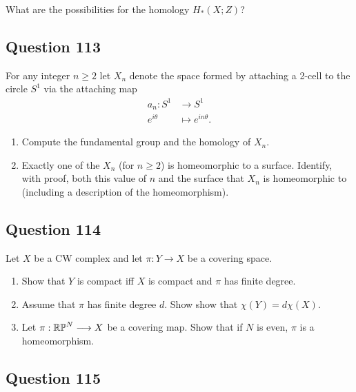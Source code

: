 \documentclass[12pt]{article}
\begin{document}
What are the possibilities for the homology \(H_* (X; Z)\)?

\hypertarget{question-113-2}{%
\subsection{Question 113}\label{question-113-2}}

For any integer \(n \geq 2\) let \(X_n\) denote the space formed by
attaching a 2-cell to the circle \(S^1\) via the attaching map
\begin{align*}
a_n: S^1 &\to S^1 \\
e^{i\theta} &\mapsto e^{in\theta}
.\end{align*}

\begin{enumerate}
\def\labelenumi{\alph{enumi}.}
\item
  Compute the fundamental group and the homology of \(X_n\).
\item
  Exactly one of the \(X_n\) (for \(n \geq 2\)) is homeomorphic to a
  surface. Identify, with proof, both this value of \(n\) and the
  surface that \(X_n\) is homeomorphic to (including a description of
  the homeomorphism).
\end{enumerate}

\hypertarget{question-114-2}{%
\subsection{Question 114}\label{question-114-2}}

Let \(X\) be a CW complex and let \(\pi : Y \to X\) be a covering space.

\begin{enumerate}
\def\labelenumi{\alph{enumi}.}
\item
  Show that \(Y\) is compact iff \(X\) is compact and \(\pi\) has finite
  degree.
\item
  Assume that \(\pi\) has finite degree \(d\). Show show that
  \(\chi (Y ) = d \chi (X)\).
\item
  Let \(\pi :{\mathbb{RP}}^N \longrightarrow X\) be a covering map. Show that if \(N\) is
  even, \(\pi\) is a homeomorphism.
\end{enumerate}

\hypertarget{question-115-2}{%
\subsection{Question 115}\label{question-115-2}}
\end{document}
